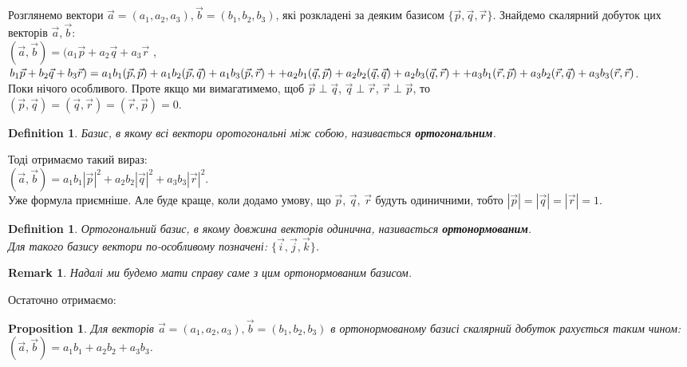 \documentclass[a4paper, 10pt]{extarticle}
\theoremstyle{theoremdd}
\theoremstyle{theoremdd}
\newtheorem{definition}[theorem]{Definition}
\theoremstyle{theoremdd}
\theoremstyle{theoremdd}
\theoremstyle{theoremdd}
\newtheorem{proposition}[theorem]{Proposition}
\theoremstyle{theoremdd}
\newtheorem{remark}[theorem]{Remark}
\theoremstyle{theoremdd}
\theoremstyle{theoremdd}
\begin{document}
	Розглянемо вектори $\vec{a} = (a_1, a_2, a_3), \vec{b} = (b_1, b_2, b_3)$, які розкладені за деяким базисом $\{\vec{p}, \vec{q}, \vec{r}\}$. Знайдемо скалярний добуток цих векторів $\vec{a},\vec{b}$:\\
	$(\vec{a}, \vec{b}) = (a_1\vec{p} + a_2\vec{q} + a_3\vec{r}$ , $b_1\vec{p} + b_2\vec{q} + b_3\vec{r}) = \\
	a_1 b_1 (\vec{p}, \vec{p}) + a_1 b_2 (\vec{p}, \vec{q}) + a_1 b_3 (\vec{p}, \vec{r}) + 
	+ a_2 b_1 (\vec{q}, \vec{p}) + a_2 b_2 (\vec{q}, \vec{q}) + a_2 b_3 (\vec{q}, \vec{r}) + 
	+ a_3 b_1 (\vec{r}, \vec{p}) + a_3 b_2 (\vec{r}, \vec{q}) + a_3 b_3 (\vec{r}, \vec{r})$.\\
	Поки нічого особливого. Проте якщо ми вимагатимемо, щоб $\vec{p} \perp \vec{q}$, $\vec{q} \perp \vec{r}$, $\vec{r} \perp \vec{p}$, то \\
	$(\vec{p}, \vec{q}) = (\vec{q}, \vec{r}) = (\vec{r}, \vec{p}) = 0$.
	
\begin{definition}
	Базис, в якому всі вектори оротогональні між собою, називається \textbf{ортогональним}.
\end{definition}

	Тоді отримаємо такий вираз:\\
	$(\vec{a}, \vec{b}) = a_1 b_1 |\vec{p}|^2 + a_2 b_2 |\vec{q}|^2 + a_3 b_3 |\vec{r}|^2$.\\
	Уже формула приємніше. Але буде краще, коли додамо умову, що $\vec{p}$, $\vec{q}$, $\vec{r}$ будуть одиничними, тобто $|\vec{p}| = |\vec{q}| = |\vec{r}| = 1$.
	
\begin{definition}
	Ортогональний базис, в якому довжина векторів одинична, називається \textbf{ортонормованим}.\\
	Для такого базису вектори по-особливому позначені: $\{\vec{i}, \vec{j}, \vec{k}\}$.
\end{definition}

\begin{remark}
	Надалі ми будемо мати справу саме з цим ортонормованим базисом.
\end{remark}

	Остаточно отримаємо:
\begin{proposition}
	Для векторів $\vec{a} = (a_1, a_2, a_3), \vec{b} = (b_1, b_2, b_3)$ в ортонормованому базисі скалярний добуток рахується таким чином: $(\vec{a}, \vec{b}) = a_1 b_1 + a_2 b_2 + a_3 b_3$.
\end{proposition}
\end{document}

